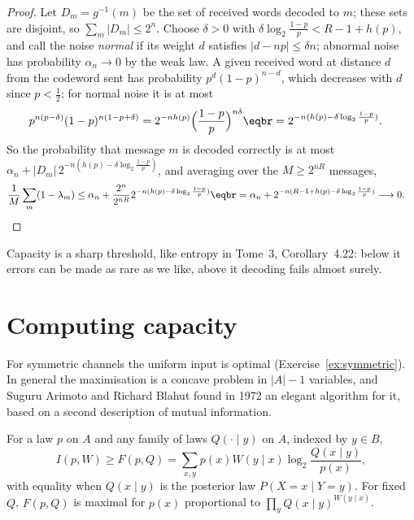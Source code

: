 \begin{proof}
Let $D_m=g^{-1}(m)$ be the set of received words decoded to $m$; these sets are disjoint, so $\sum_m|D_m|\le2^n$. Choose $\delta>0$ with $\delta\log_2\frac{1-p}p<R-1+h(p)$, and call the noise \emph{normal} if its weight $d$ satisfies $|d-np|\le\delta n$; abnormal noise has probability $\alpha_n\to0$ by the weak law. A given received word at distance $d$ from the codeword sent has probability $p^d(1-p)^{n-d}$, which decreases with $d$ since $p<\frac12$; for normal noise it is at most
\[
\begin{aligned}p^{n(p-\delta)}(1-p)^{n(1-p+\delta)}&=2^{-nh(p)}\Bigl(\frac{1-p}p\Bigr)^{n\delta}\eqbr=2^{-n(h(p)-\delta\log_2\frac{1-p}p)}.\end{aligned}
\]
So the probability that message $m$ is decoded correctly is at most $\alpha_n+|D_m|\,2^{-n(h(p)-\delta\log_2\frac{1-p}p)}$, and averaging over the $M\ge2^{nR}$ messages,
\[
\begin{aligned}\frac1M\sum_m(1-\lambda_m)&\le\alpha_n+\frac{2^n}{2^{nR}}2^{-n(h(p)-\delta\log_2\frac{1-p}p)}\eqbr=\alpha_n+2^{-n(R-1+h(p)-\delta\log_2\frac{1-p}p)}\longrightarrow0.\end{aligned}\qedhere
\]
\end{proof}

Capacity is a sharp threshold, like entropy in Tome~3, Corollary~4.22: below it errors can be made as rare as we like, above it decoding fails almost surely.

\section{Computing capacity}\label{sec:blahut}

For symmetric channels the uniform input is optimal (Exercise~\ref{ex:symmetric}). In general the maximisation is a concave problem in $|A|-1$ variables, and Suguru Arimoto and Richard Blahut found in 1972 an elegant algorithm for it, based on a second description of mutual information.

\begin{proposition}\label{prop:variational}
For a law $p$ on $A$ and any family of laws $Q(\cdot\mid y)$ on $A$, indexed by $y\in B$,
\[
I(p,W)\ge F(p,Q)=\sum_{x,y}p(x)W(y\mid x)\log_2\frac{Q(x\mid y)}{p(x)},
\]
with equality when $Q(x\mid y)$ is the posterior law $P(X=x\mid Y=y)$. For fixed $Q$, $F(p,Q)$ is maximal for $p(x)$ proportional to $\prod_y Q(x\mid y)^{W(y\mid x)}$.
\end{proposition}

